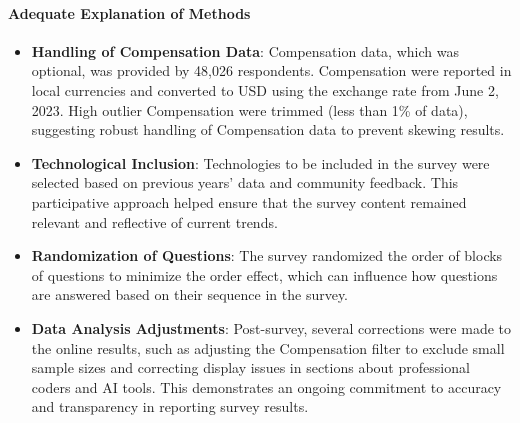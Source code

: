 \documentclass[
  12pt,
]{article}
\begin{document}
\hypertarget{adequate-explanation-of-methods}{%
\paragraph{Adequate Explanation of
Methods}\label{adequate-explanation-of-methods}}

\begin{itemize}
\item
  \textbf{Handling of Compensation Data}: Compensation data, which was
  optional, was provided by 48,026 respondents. Compensation were
  reported in local currencies and converted to USD using the exchange
  rate from June 2, 2023. High outlier Compensation were trimmed (less
  than 1\% of data), suggesting robust handling of Compensation data to
  prevent skewing results.
\item
  \textbf{Technological Inclusion}: Technologies to be included in the
  survey were selected based on previous years' data and community
  feedback. This participative approach helped ensure that the survey
  content remained relevant and reflective of current trends.
\item
  \textbf{Randomization of Questions}: The survey randomized the order
  of blocks of questions to minimize the order effect, which can
  influence how questions are answered based on their sequence in the
  survey.
\item
  \textbf{Data Analysis Adjustments}: Post-survey, several corrections
  were made to the online results, such as adjusting the Compensation
  filter to exclude small sample sizes and correcting display issues in
  sections about professional coders and AI tools. This demonstrates an
  ongoing commitment to accuracy and transparency in reporting survey
  results.
\end{itemize}
\end{document}
